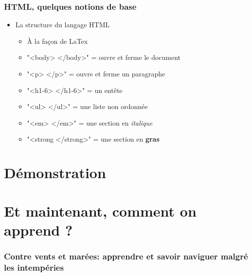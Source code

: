 \documentclass{beamer}
\begin{document}
      \begin{frame}
        \frametitle{HTML, quelques notions de base}
          \begin{itemize}
            \item<2-> La structure du langage HTML
              \begin{itemize}
                \item À la façon de LaTex
                \item "<body> </body>" = ouvre et ferme le document
                \item "<p> </p>" = ouvre et ferme un paragraphe
                \item "<h1-6> </h1-6>" = un entête
                \item "<ul> </ul>" =  une liste non ordonnée 
                \item "<em> </em>" = une section en \textit{italique}
                \item "<strong </strong>" = une section en \textbf{gras}
              \end{itemize}
            \end{itemize}
      \end{frame}
     \section{Démonstration}



\section{Et maintenant, comment on apprend ?}

    \begin{frame}
    
        \frametitle{Contre vents et marées: apprendre \R et savoir naviguer malgré les intempéries} \vspace{1cm}
    
    \end{frame}
    
\end{document}

